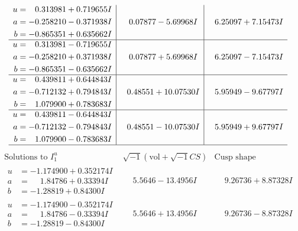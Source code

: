 \documentclass[1p]{elsarticle_modified}
\theoremstyle{definition}
\newcommand{\I}{\sqrt{-1}}
\begin{document}
$$\begin{array}{c|c|c}
\begin{aligned}
u &= \phantom{-}0.313981 + 0.719655 I \\
a &= -0.258210 - 0.371938 I \\
b &= -0.865351 + 0.635662 I\end{aligned}
 & \phantom{-}0.07877 - 5.69968 I & \phantom{-}6.25097 + 7.15473 I \\ \hline\begin{aligned}
u &= \phantom{-}0.313981 - 0.719655 I \\
a &= -0.258210 + 0.371938 I \\
b &= -0.865351 - 0.635662 I\end{aligned}
 & \phantom{-}0.07877 + 5.69968 I & \phantom{-}6.25097 - 7.15473 I \\ \hline\begin{aligned}
u &= \phantom{-}0.439811 + 0.644843 I \\
a &= -0.712132 + 0.794843 I \\
b &= \phantom{-}1.079900 + 0.783683 I\end{aligned}
 & \phantom{-}0.48551 + 10.07530 I & \phantom{-}5.95949 - 9.67797 I \\ \hline\begin{aligned}
u &= \phantom{-}0.439811 - 0.644843 I \\
a &= -0.712132 - 0.794843 I \\
b &= \phantom{-}1.079900 - 0.783683 I\end{aligned}
 & \phantom{-}0.48551 - 10.07530 I & \phantom{-}5.95949 + 9.67797 I\\
 \hline 
 \end{array}$$\newpage$$\begin{array}{c|c|c}  
\text{Solutions to }I^u_{1}& \I (\text{vol} + \sqrt{-1}CS) & \text{Cusp shape}\\
 \hline 
\begin{aligned}
u &= -1.174900 + 0.352174 I \\
a &= \phantom{-}1.84786 + 0.33394 I \\
b &= -1.28819 + 0.84300 I\end{aligned}
 & \phantom{-}5.5646 - 13.4956 I & \phantom{-}9.26736 + 8.87328 I \\ \hline\begin{aligned}
u &= -1.174900 - 0.352174 I \\
a &= \phantom{-}1.84786 - 0.33394 I \\
b &= -1.28819 - 0.84300 I\end{aligned}
 & \phantom{-}5.5646 + 13.4956 I & \phantom{-}9.26736 - 8.87328 I \\ \hline\begin{aligned}

\end{aligned}
\end{array}$$
\end{document}
